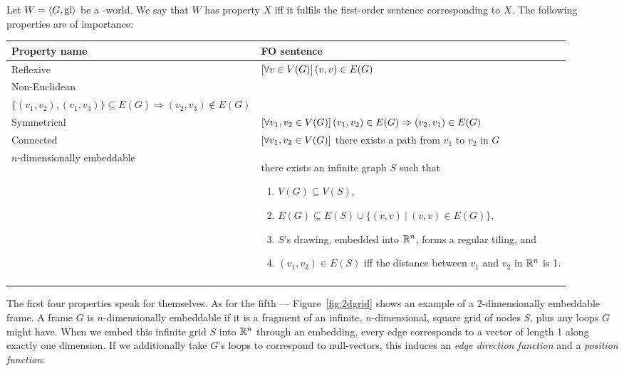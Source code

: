 \begin{definition}
	Let $W = \langle G,\mathrm{gl} \rangle$ be a \wext-world. We say that $W$ has property $X$ iff it fulfils the first-order sentence corresponding to $X$. The following properties are of importance:
	
	

	\begin{center}
		\begin{tabular}[b]{l l}
		\toprule
		\textbf{Property name} & \textbf{FO sentence}\\
		\midrule\addlinespace[0.7em]
		Reflexive & $\left[\forall v \in V(G) \right] (v,v) \in E(G)$\\ \addlinespace[0.7em]
		Non-Euclidean &
		\begin{minipage}[t]{0.65\textwidth}
			$\allQ{\textit{ pairwise distinct } v_1,v_2,v_3 \in V(G)}$\\$\{(v_1,v_2),(v_1,v_3)\} \subseteq E(G) \Rightarrow (v_2,v_3) \notin E(G)$
		\end{minipage}\\ \addlinespace[0.7em]
		Symmetrical & $\left[\forall v_1,v_2 \in V(G) \right] (v_1,v_2) \in E(G) \Rightarrow (v_2,v_1) \in E(G)$\\ \addlinespace[0.7em]
		Connected & $\left[\forall v_1,v_2 \in V(G) \right]$ there exists a path from $v_1$ to $v_2$ in $G$\\ \addlinespace[0.7em]
		
		$n$-dimensionally embeddable
		 &
		\begin{minipage}[t]{0.65\textwidth}
		there exists an infinite graph $S$ such that
		\begin{enumerate}
			\item $V(G) \subseteq V(S)$,
			\item $E(G) \subseteq E(S) \cup \{ (v,v)\ |\ (v,v) \in E(G) \}$,
			\item $S$'s drawing, embedded into $\mathbb{R}^n$, forms a regular tiling, and
			\item $(v_1,v_2) \in E(S)$ iff the distance between $v_1$ and $v_2$ in $\mathbb{R}^n$ is 1.
		\end{enumerate}
		\end{minipage}
		
		\\ \addlinespace[0.5em]
		\bottomrule
		
		\end{tabular}
	\end{center}
\end{definition}

The first four properties speak for themselves. As for the fifth --- Figure~\ref{fig:2dgrid} shows an example of a 2-dimensionally embeddable frame. A frame $G$ is $n$-dimensionally embeddable if it is a fragment of an infinite, $n$-dimensional, square grid of nodes $S$, plus any loops $G$ might have. When we embed this infinite grid $S$ into $\mathbb{R}^n$ through an embedding, every edge corresponds to a vector of length 1 along exactly one dimension. If we additionally take $G$'s loops to correspond to null-vectors, this induces an {\em edge direction function} and a {\em position function}:

